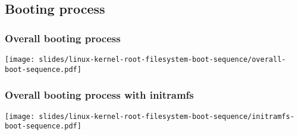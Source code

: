 \subsection{Booting process}
\begin{frame}
  \frametitle{Overall booting process}
  \begin{center}
    \texttt{[image: slides/linux-kernel-root-filesystem-boot-sequence/overall-boot-sequence.pdf]}
  \end{center}
\end{frame}

\begin{frame}
  \frametitle{Overall booting process with initramfs}
  \begin{center}
    \texttt{[image: slides/linux-kernel-root-filesystem-boot-sequence/initramfs-boot-sequence.pdf]}
  \end{center}
\end{frame}

